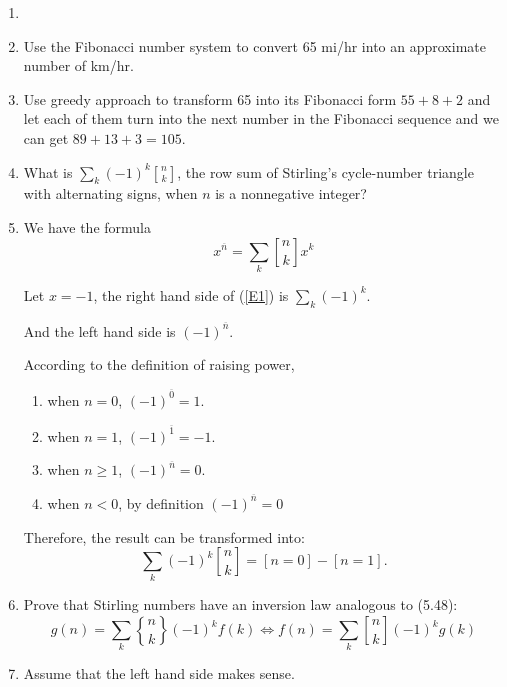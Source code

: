 \documentclass[12pt,a4paper]{article}
\makeatletter
\newtheorem*{solution}{Solution}
\theoremstyle{definition}
\renewenvironment{solution}[1][Solution] {\par\pushQED{\qed}\normalfont\topsep6\p@\@plus6\p@\relax\trivlist\item[\hskip\labelsep\bfseries#1\@addpunct{.}]\ignorespaces}{\popQED\endtrivlist\@endpefalse} \makeatother
\makeatother
\begin{document}
\begin{enumerate}
\begin{solution}
        	
        \end{solution}
    \item 
        Use the Fibonacci number system to convert 65 mi/hr into an approximate number of km/hr.
        \begin{solution}
        	Use greedy approach to transform 65 into its Fibonacci form $55+8+2$ and let each of them turn into the next number in the Fibonacci sequence and we can get $89+13+3=105$.
        \end{solution}
    \item 
        What is $\sum_{k}(-1)^k {n \brack k}$, the row sum of Stirling's cycle-number triangle with alternating signs, when $n$ is a nonnegative integer?
       \begin{solution}
    	We have the formula
    	\begin{equation}\label{E1}
    	    x^{\overline{n}}=\sum_{k}{n \brack k}x^k
    	\end{equation}
    
    	Let $x=-1$, the right hand side of (\ref{E1}) is $\sum_{k}(-1)^k$.
    	
    	And the left hand side is $(-1)^{\overline{n}}$.
    	
    	According to the definition of raising power, 
    	\begin{enumerate}
    		\item 
    		    when $n=0$, $(-1)^{\overline{0}}=1$.
    		\item 
    		    when $n=1$, $(-1)^{\overline{1}}=-1$.
    		\item 
    		    when $n\ge 1$, $(-1)^{\overline{n}}=0$.
    		\item 
    		    when $n<0$, by definition $(-1)^{\overline{n}}=0$
    	\end{enumerate}
    	Therefore, the result can be transformed into:
       \begin{equation*}
            \sum_k(-1)^k {n \brack k}=[n=0]-[n=1].
         \end{equation*}
      \end{solution}
    \item 
        Prove that Stirling numbers have an inversion law analogous to (5.48):
        \begin{equation*}
           g(n)=\sum_k{n \brace k}(-1)^kf(k) \Leftrightarrow f(n)=\sum_k{n \brack k}(-1)^kg(k)
        \end{equation*}
        \begin{solution}
        	Assume that the left hand side makes sense.
        	

\end{solution}
\end{enumerate}
\end{document}
